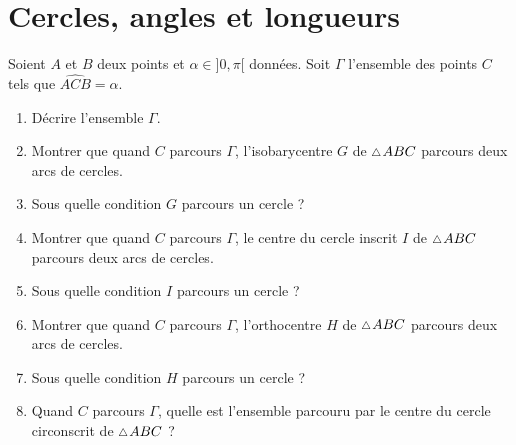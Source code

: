 \documentclass[a4paper,11pt,reqno]{amsart}
\begin{document}
\section{Cercles, angles et longueurs}

\begin{exo}

  Soient $A$ et $B$ deux points  et $\alpha \in ]0,\pi[$ données. Soit $\Gamma$ l'ensemble des points $C$ tels que $\widehat{ACB}=\alpha$.
  \begin{enumerate}
    \item Décrire l'ensemble $\Gamma$.
    \item Montrer que quand $C$ parcours $\Gamma$, l'isobarycentre $G$ de $\tri ABC$ parcours deux arcs de cercles.
    \item Sous quelle condition $G$ parcours un cercle ?
    \item Montrer que quand $C$ parcours $\Gamma$, le centre du cercle inscrit $I$ de $\tri ABC$ parcours deux arcs de cercles.
    \item Sous quelle condition $I$ parcours un cercle ?
    \item Montrer que quand $C$ parcours $\Gamma$, l'orthocentre $H$ de $\tri ABC$ parcours deux arcs de cercles.
    \item Sous quelle condition $H$ parcours un cercle ?
    \item Quand $C$ parcours $\Gamma$, quelle est l'ensemble parcouru par le centre du cercle circonscrit de $\tri ABC$ ?
  \end{enumerate}
\end{exo}
\end{document}
